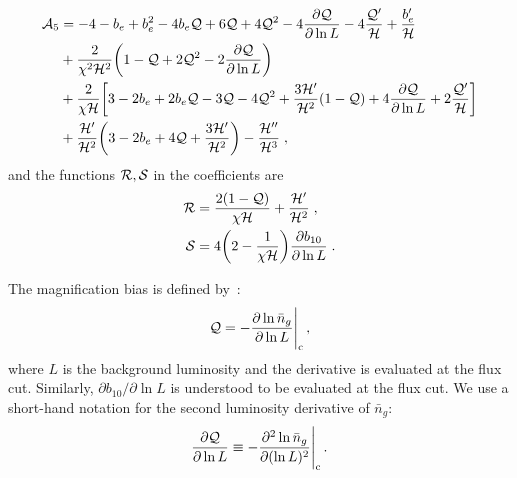 \begin{align}
\mathcal{A}_{5} &=  -4-b_{e}+b_{e}^{2}-4b_{e}\mathcal{Q}+ {6}\mathcal{Q}+4\mathcal{Q}^{2}-4\frac{\partial \mathcal{Q}}{\partial \ln{{L}}} - 4\frac{\mathcal{Q}'}{\mathcal{H}} + \frac{b_{e}'}{\mathcal{H}} \nonumber \\
& + \frac{2}{\chi^{2}\mathcal{H}^{2}}\bigg(1-\mathcal{Q}+2\mathcal{Q}^{2}-2\frac{\partial \mathcal{Q}}{\partial \ln{{L}}}\bigg) \nonumber \\
& + \frac{2}{\chi\mathcal{H}}\bigg[3-2b_{e}+2b_{e}\mathcal{Q}-3\mathcal{Q}-4\mathcal{Q}^{2}+\frac{3\mathcal{H}'}{\mathcal{H}^{2}}(1-\mathcal{Q}) + 4\frac{\partial \mathcal{Q}}{\partial \ln{{L}}} + 2\frac{\mathcal{Q}'}{\mathcal{H}}\bigg]  \nonumber \\
& + \frac{\mathcal{H}'}{\mathcal{H}^{2}}\bigg(3-2b_{e}+{4}\mathcal{Q}+\frac{3\mathcal{H}'}{\mathcal{H}^{2}}\bigg) - \frac{\mathcal{H}''}{\mathcal{H}^{3}}\;, \label{e6} 
\end{align}
and the functions ${\cal R}, {\cal S}$ in the coefficients are
\begin{align}
\mathcal{R} &= \frac{2(1-\mathcal{Q})}{\chi\mathcal{H}}+\frac{\mathcal{H}'}{\mathcal{H}^{2}}\;, \label{e1}\\
\mathcal{S} &= 4\bigg(2-\frac{1}{\chi\mathcal{H}}\bigg)\frac{\partial b_{10}}{\partial \ln{{L}}}\;. \label{e1'}
\end{align}

The magnification bias is defined by~\cite{Alonso:2015uua,DiDio:2015bua,Maartens:2019yhx}:
\begin{equation}
{\cal Q}= - \frac{\partial \ln \bar{n}_g}{\partial \ln L}\Bigg|_{\mathrm{c}}\,,
\end{equation}
where $L$ is the background luminosity and the derivative is evaluated at the flux cut. Similarly,  $\partial b_{10} / \partial \ln L$ is understood to be evaluated at the flux cut.
We use a short-hand notation for the second luminosity derivative of $\bar{n}_g$:
\begin{equation}
\frac{\partial {\cal Q}}{\partial \ln L}\equiv - \frac{\partial^2 \ln \bar{n}_g}{\partial (\ln L)^2}\Bigg|_{\mathrm{c}}\,.
\end{equation}